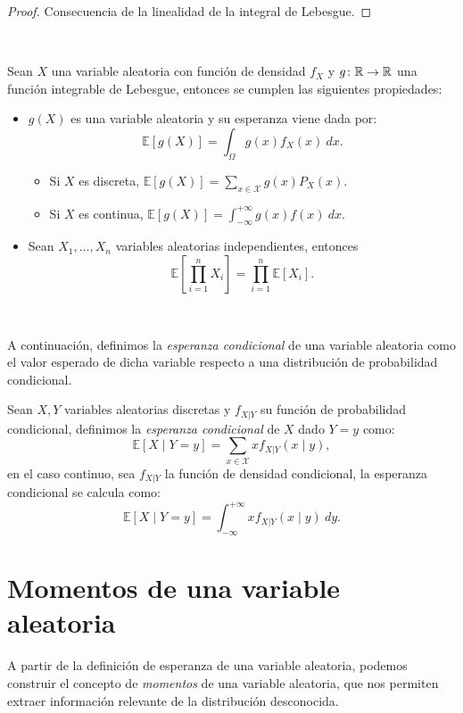 \documentclass[oneside,openright,titlepage,numbers=noenddot,openany,headinclude,footinclude=true,
cleardoublepage=empty,abstractoff,BCOR=5mm,paper=a4,fontsize=12pt,main=spanish]{scrreprt}
\begin{document}
\begin{proof}
Consecuencia de la linealidad de la integral de Lebesgue.
\end{proof}\

\begin{proposition}
Sean $X$ una variable aleatoria con función de densidad $f_X$ y $g\colon \mathbb{R} \to \mathbb{R}$ una función integrable de Lebesgue, entonces se cumplen las siguientes propiedades:
\begin{itemize}
    \item $g(X)$ es una variable aleatoria y su esperanza viene dada por: $$\mathbb{E}[g(X)]=\int_\Omega g(x)f_X(x) \ dx.$$ 
    \begin{itemize}
        \item Si $X$ es discreta, $\displaystyle \mathbb{E}[g(X)]=\sum_{x\in \mathcal{X}} g(x)P_X(x).$
        \item Si $X$ es continua, $\displaystyle \mathbb{E}[g(X)]=\int_{-\infty}^{+\infty}g(x) f(x) \ dx.$
    \end{itemize}
    \item Sean $X_1,\dots,X_n$ variables aleatorias independientes, entonces $$\mathbb{E}\left[\prod_{i=1}^n X_i \right]=\prod_{i=1}^n \mathbb{E}[X_i].$$
\end{itemize}
\end{proposition}\

A continuación, definimos la \textit{esperanza condicional} de una variable aleatoria como el valor esperado de dicha variable respecto a una distribución de probabilidad condicional.\\

\begin{definition}
Sean $X,Y$ variables aleatorias discretas y $f_{X | Y}$ su función de probabilidad condicional, definimos la \textit{esperanza condicional} de $X$ dado $Y=y$ como: $$\mathbb{E}[X \mid Y=y]=\sum_{x\in \mathcal{X}} x f_{X | Y}(x \mid y),$$
en el caso continuo, sea $f_{X|Y}$ la función de densidad condicional, la esperanza condicional se calcula como: $$\mathbb{E}[X \mid Y=y]=\int_{-\infty}^{+\infty} x f_{X | Y}(x \mid y) \ dy.$$
\end{definition}

\clearpage

\section{Momentos de una variable aleatoria}

A partir de la definición de esperanza de una variable aleatoria, podemos construir el concepto de \textit{momentos} de una variable aleatoria, que nos permiten extraer información relevante de la distribución desconocida.\\
\end{document}
